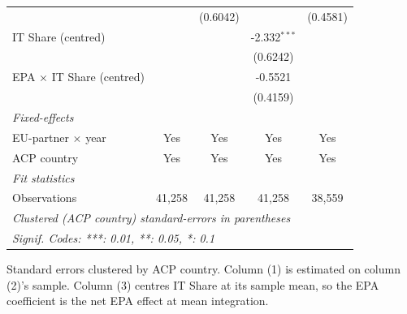 \begin{tabular}{lcccc}
                                    &                              & (0.6042)                            &                                    & (0.4581)\\   
   IT Share (centred)               &                              &                                     & -2.332$^{***}$                     &   \\   
                                    &                              &                                     & (0.6242)                           &   \\   
   EPA $\times$ IT Share (centred)  &                              &                                     & -0.5521                            &   \\   
                                    &                              &                                     & (0.4159)                           &   \\   
   \midrule
   \emph{Fixed-effects}\\
   EU-partner $\times$ year         & Yes                          & Yes                                 & Yes                                & Yes\\  
   ACP country                      & Yes                          & Yes                                 & Yes                                & Yes\\  
   \midrule
   \emph{Fit statistics}\\
   Observations                     & 41,258                       & 41,258                              & 41,258                             & 38,559\\  
   \midrule \midrule
   \multicolumn{5}{l}{\emph{Clustered (ACP country) standard-errors in parentheses}}\\
   \multicolumn{5}{l}{\emph{Signif. Codes: ***: 0.01, **: 0.05, *: 0.1}}\\
\end{tabular}
 
\par \raggedright 
Standard errors clustered by ACP country. Column (1) is estimated on column (2)'s sample. Column (3) centres IT Share at its sample mean, so the EPA coefficient is the net EPA effect at mean integration.
\par\endgroup


